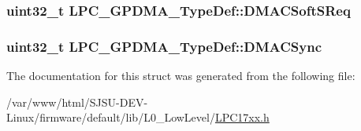 \subsubsection[{\texorpdfstring{D\+M\+A\+C\+Soft\+S\+Req}{DMACSoftSReq}}]{ uint32\+\_\+t L\+P\+C\+\_\+\+G\+P\+D\+M\+A\+\_\+\+Type\+Def\+::\+D\+M\+A\+C\+Soft\+S\+Req}\hypertarget{structLPC__GPDMA__TypeDef_ae8034553a3c3c6bfaec53a07c9aa9b74}{}\label{structLPC__GPDMA__TypeDef_ae8034553a3c3c6bfaec53a07c9aa9b74}
\subsubsection[{\texorpdfstring{D\+M\+A\+C\+Sync}{DMACSync}}]{ uint32\+\_\+t L\+P\+C\+\_\+\+G\+P\+D\+M\+A\+\_\+\+Type\+Def\+::\+D\+M\+A\+C\+Sync}\hypertarget{structLPC__GPDMA__TypeDef_a7f32a90d23582dccffefe4f5b46fa841}{}\label{structLPC__GPDMA__TypeDef_a7f32a90d23582dccffefe4f5b46fa841}


The documentation for this struct was generated from the following file\+:\begin{DoxyCompactItemize}
\item 
/var/www/html/\+S\+J\+S\+U-\/\+D\+E\+V-\/\+Linux/firmware/default/lib/\+L0\+\_\+\+Low\+Level/\hyperlink{LPC17xx_8h}{L\+P\+C17xx.\+h}\end{DoxyCompactItemize}
